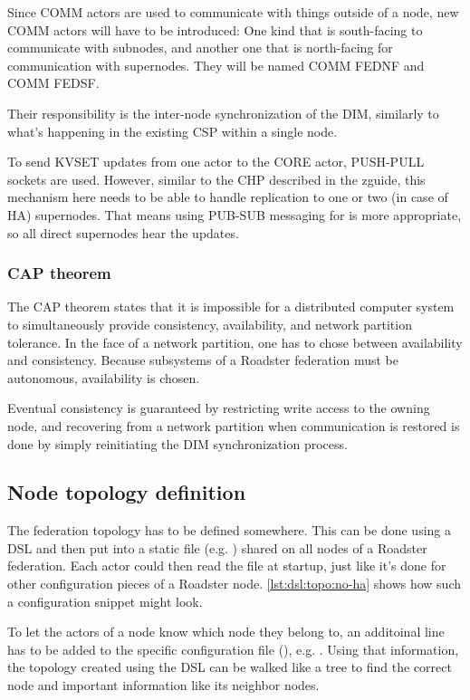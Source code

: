 Since COMM actors are used to communicate with things outside of a node, new COMM
actors will have to be introduced: One kind that is south-facing to communicate
with subnodes, and another one that is north-facing for communication with
supernodes. They will be named COMM FEDNF and COMM FEDSF. %

Their responsibility is the inter-node synchronization of the DIM, similarly to
what's happening in the existing CSP within a single node.

To send KVSET updates from one actor to the CORE actor, PUSH-PULL sockets are
used. However, similar to the \gls{CHP} described in the \gls{zguide}, this
mechanism here needs to be able to handle replication to one or two (in case of
HA) supernodes. That means using PUB-SUB messaging for is more
appropriate, so all direct supernodes hear the updates.

\subsubsection{CAP theorem}
The CAP theorem \cite{wp:cap} states that it is impossible for a distributed
computer system to simultaneously provide consistency, availability, and
network partition tolerance. In the face of a network partition, one has to
chose between availability and consistency. Because subsystems of a Roadster
federation must be autonomous, availability is chosen.

Eventual consistency is guaranteed by restricting write access to the owning
node, and recovering from a network partition when communication is restored is
done by simply reinitiating the DIM synchronization process.

\subsection{Node topology definition}
The federation topology has to be defined somewhere. This can be done using a
\gls{DSL} and then put into a static file (e.g. ) shared
on all nodes of a Roadster federation. Each actor could then read the file at
startup, just like it's done for other configuration pieces of a Roadster node.
\autoref{lst:dsl:topo:no-ha} shows how such a configuration snippet might look.

To let the actors of a node know which node they belong to, an additoinal line
has to be added to the specific configuration file (), e.g.
. Using that information, the topology
created using the DSL can be walked like a tree to find the correct node and
important information like its neighbor nodes.

